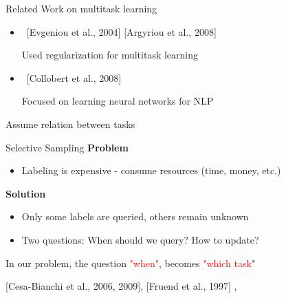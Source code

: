 \documentclass{beamer}
\begin{document}
\begin{frame}{ Related Work on multitask learning}
\begin{itemize}
\item \ [Evgeniou et al., 2004] [Argyriou et al., 2008]\newline

Used regularization for multitask learning\newline
\item \ [Collobert et al., 2008]\newline

Focused on  learning neural networks for NLP\newline


\end{itemize}

 Assume relation between  tasks

\end{frame}

\begin{frame}{Selective Sampling}
\textbf{Problem} \newline
\begin{itemize}
\item Labeling  is  expensive - consume resources (time, money, etc.) \newline
\end{itemize}
\textbf{Solution} \newline
\begin{itemize}
\item Only some  labels are queried, others remain unknown\newline
\item Two questions: When should we query? How to update?\newline
\end{itemize}

In our problem, the question \textcolor{red}{"when"}, becomes \textcolor{red}{"which task}"\newline

[Cesa-Bianchi et al., 2006, 2009], [Fruend et al., 1997] ,\newline
[Crammer , 2014] \newline
\end{frame}
\end{document}
